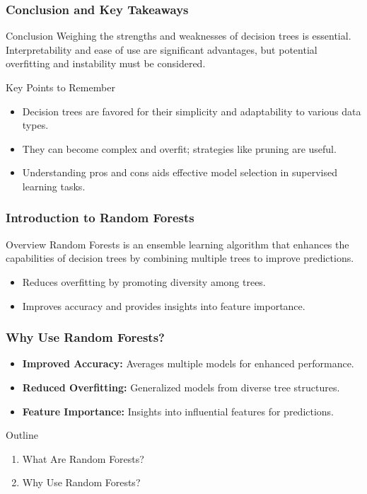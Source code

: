 \documentclass[aspectratio=169]{beamer}
\begin{document}
\begin{frame}[fragile]
    \frametitle{Conclusion and Key Takeaways}
    \begin{block}{Conclusion}
        Weighing the strengths and weaknesses of decision trees is essential. Interpretability and ease of use are significant advantages, but potential overfitting and instability must be considered.
    \end{block}

    \begin{block}{Key Points to Remember}
        \begin{itemize}
            \item Decision trees are favored for their simplicity and adaptability to various data types.
            \item They can become complex and overfit; strategies like pruning are useful.
            \item Understanding pros and cons aids effective model selection in supervised learning tasks.
        \end{itemize}
    \end{block}
\end{frame}

\begin{frame}[fragile]
    \frametitle{Introduction to Random Forests}
    \begin{block}{Overview}
        Random Forests is an ensemble learning algorithm that enhances the capabilities of decision trees by combining multiple trees to improve predictions.
    \end{block}
    \begin{itemize}
        \item Reduces overfitting by promoting diversity among trees.
        \item Improves accuracy and provides insights into feature importance.
    \end{itemize}
\end{frame}

\begin{frame}[fragile]
    \frametitle{Why Use Random Forests?}
    \begin{itemize}
        \item \textbf{Improved Accuracy:} Averages multiple models for enhanced performance.
        \item \textbf{Reduced Overfitting:} Generalized models from diverse tree structures.
        \item \textbf{Feature Importance:} Insights into influential features for predictions.
    \end{itemize}
    \begin{block}{Outline}
        \begin{enumerate}
            \item What Are Random Forests?
            \item Why Use Random Forests?
        \end{enumerate}
    \end{block}
\end{frame}
\end{document}
